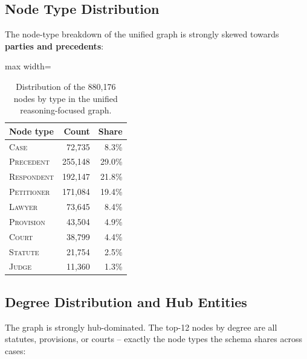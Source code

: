 \subsection{Node Type Distribution}

The node-type breakdown of the unified graph is strongly skewed
towards \textbf{parties and precedents}:

\begin{table}[H]
  \centering
  \small
  \begin{adjustbox}{max width=\textwidth}
  \begin{tabular}{lrr}
    \toprule
    Node type & Count & Share \\
    \midrule
    \textsc{Case} & 72{,}735 & 8.3\% \\
    \textsc{Precedent} & 255{,}148 & 29.0\% \\
    \textsc{Respondent} & 192{,}147 & 21.8\% \\
    \textsc{Petitioner} & 171{,}084 & 19.4\% \\
    \textsc{Lawyer} & 73{,}645 & 8.4\% \\
    \textsc{Provision} & 43{,}504 & 4.9\% \\
    \textsc{Court} & 38{,}799 & 4.4\% \\
    \textsc{Statute} & 21{,}754 & 2.5\% \\
    \textsc{Judge} & 11{,}360 & 1.3\% \\
    \bottomrule
  \end{tabular}
  \end{adjustbox}
  \caption{Distribution of the 880{,}176 nodes by type in the unified
  reasoning-focused graph.}
  \label{tab:node_type_dist}
\end{table}


\subsection{Degree Distribution and Hub Entities}

The graph is strongly hub-dominated. The top-12 nodes by degree are
all statutes, provisions, or courts -- exactly the node types the
schema shares across cases:

